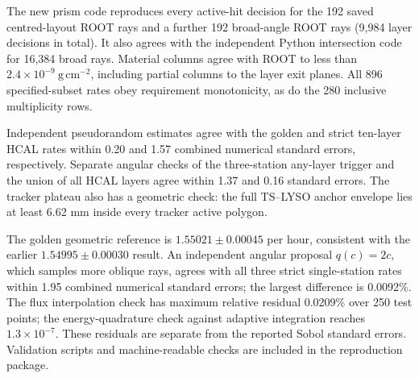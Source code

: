The new prism code reproduces every active-hit decision for the 192 saved
centred-layout ROOT rays and a further 192 broad-angle ROOT rays (9,984 layer
decisions in total). It also agrees with the independent Python intersection
code for 16,384 broad rays. Material columns agree with ROOT to less than
$2.4\times10^{-9}\ \mathrm{g\,cm^{-2}}$, including partial columns to the
layer exit planes. All 896 specified-subset rates obey requirement monotonicity,
as do the 280 inclusive multiplicity rows.

Independent pseudorandom estimates agree with the golden and strict ten-layer
HCAL rates within 0.20 and 1.57 combined numerical standard errors,
respectively. Separate angular checks of the three-station any-layer trigger
and the union of all HCAL layers agree within 1.37 and 0.16 standard errors.
The tracker plateau also has a geometric check: the full TS--LYSO anchor
envelope lies at least 6.62 mm inside every tracker active polygon.

The golden geometric reference is $1.55021\pm0.00045$ per hour, consistent
with the earlier $1.54995\pm0.00030$ result. An independent angular proposal
$q(c)=2c$, which samples more oblique rays, agrees with all three strict
single-station rates within 1.95 combined numerical standard errors; the
largest difference is 0.0092\%. The flux interpolation check has maximum
relative residual 0.0209\% over 250 test points; the energy-quadrature check
against adaptive integration reaches $1.3\times10^{-7}$. These residuals are
separate from the reported Sobol standard errors. Validation scripts and
machine-readable checks are included in the reproduction package.
